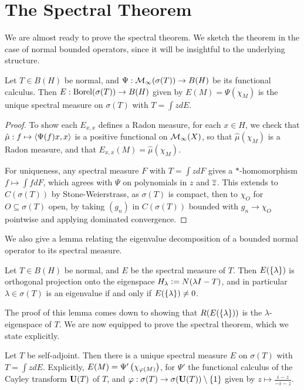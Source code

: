 \documentclass[10pt]{amsart}
\begin{document}
\section{The Spectral Theorem}
We are almost ready to prove the spectral theorem. We sketch the theorem in the case of normal bounded operators, since it will be insightful to the underlying structure.
\begin{theorem}\label{specnorm}
    Let $T \in B(H)$ be normal, and $\Psi : \mathcal{M}_\infty(\sigma(T)) \to B(H)$ be its functional calculus. Then $E : \operatorname{Borel}(\sigma(T)) \to B(H)$ given by $E(M) = \Psi(\chi_M)$ is the unique spectral measure on $\sigma(T)$ with $T = \int z dE$.
\end{theorem}
\begin{proof}
    To show each $E_{x, x}$ defines a Radon measure, for each $x \in H$, we check that $\hat\mu : f \mapsto \left\langle \Psi(f)x, x \right\rangle$ is a positive functional on $\mathcal{M}_\infty(X)$, so that $\hat\mu(\chi_M)$ is a Radon measure, and that $E_{x, x}(M) = \hat\mu(\chi_M)$.

    For uniqueness, any spectral measure $F$ with $T = \int z dF$ gives a $*$-homomorphism $f \mapsto \int f dF$, which agrees with $\Psi$ on polynomials in $z$ and $\overline{z}$. This extends to $C(\sigma(T))$ by Stone-Weierstrass, as $\sigma(T)$ is compact, then to $\chi_O$ for $O \subseteq \sigma(T)$ open, by taking $(g_n)$ in $C(\sigma(T))$ bounded with $g_n \to \chi_O$ pointwise and applying dominated convergence. 
\end{proof}
We also give a lemma relating the eigenvalue decomposition of a bounded normal operator to its spectral measure.
\begin{lemma}\label{bdnormaleigen}
    Let $T \in B(H)$ be normal, and $E$ be the spectral measure of $T$. Then $E(\left\{  \lambda  \right\})$ is orthogonal projection onto the eigenspace $H_\lambda \vcentcolon= N(\lambda I - T)$, and in particular $\lambda \in \sigma(T)$ is an eigenvalue if and only if $E(\left\{  \lambda  \right\}) \neq 0$.
\end{lemma}
The proof of this lemma comes down to showing that $R(E(\left\{  \lambda  \right\}))$ is the $\lambda$-eigenspace of $T$. We are now equipped to prove the spectral theorem, which we state explicitly.
\begin{theorem}
    Let $T$ be self-adjoint. Then there is a unique spectral measure $E$ on $\sigma(T)$ with $T = \int z dE$. Explicitly, $E(M) = \Psi'\left(  \chi_{\varphi(M)}  \right)$, for $\Psi'$ the functional calculus of the Cayley transform $\mathbf{U}(T)$ of $T$, and $\varphi : \sigma(T) \to \sigma(\mathbf{U}(T)) \setminus \left\{  1  \right\}$ given by $z \mapsto \frac{i - z}{-i - z}$.
\end{theorem}
\end{document}
